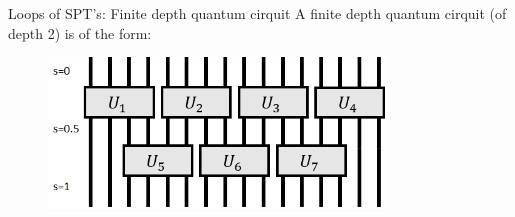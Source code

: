\documentclass{beamer}
\begin{document}
\begin{frame}{Loops of SPT's: Finite depth quantum cirquit}
A finite depth quantum cirquit (of depth 2) is of the form:
\begin{figure}
\center
\includegraphics[width=0.8\textwidth]{FiniteDepthQuantumCirquit.png}
\end{figure}
\end{frame}
\end{document}
